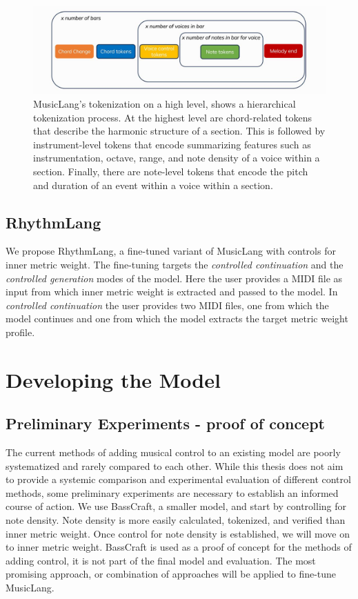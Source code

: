 \begin{figure}[H]
\centering
\includegraphics[width=1\textwidth]{IMAGES/MusicLang.JPG} 
\caption{MusicLang's tokenization on a high level, shows a hierarchical tokenization process. At the highest level are chord-related tokens that describe the harmonic structure of a section. This is followed by instrument-level tokens that encode summarizing features such as instrumentation, octave, range, and note density of a voice within a section. Finally, there are note-level tokens that encode the pitch and duration of an event within a voice within a section.}
\label{fig:musiclangtok}
\end{figure}

\subsection{RhythmLang}
We propose RhythmLang, a fine-tuned variant of MusicLang with controls for inner metric weight. The fine-tuning targets the \textit{controlled continuation} and the \textit{controlled generation} modes of the model. Here the user provides a MIDI file as input from which inner metric weight is extracted and passed to the model. In \textit{controlled continuation} the user provides two MIDI files, one from which the model continues and one from which the model extracts the target metric weight profile. 


\section{Developing the Model}


\subsection{Preliminary Experiments - proof of concept}
The current methods of adding musical control to an existing model are poorly systematized and rarely compared to each other. While this thesis does not aim to provide a systemic comparison and experimental evaluation of different control methods, some preliminary experiments are necessary to establish an informed course of action. We use BassCraft, a smaller model, and start by controlling for note density. Note density is more easily calculated, tokenized, and verified than inner metric weight. Once control for note density is established, we will move on to inner metric weight. BassCraft is used as a proof of concept for the methods of adding control, it is not part of the final model and evaluation. The most promising approach, or combination of approaches will be applied to fine-tune MusicLang. 

